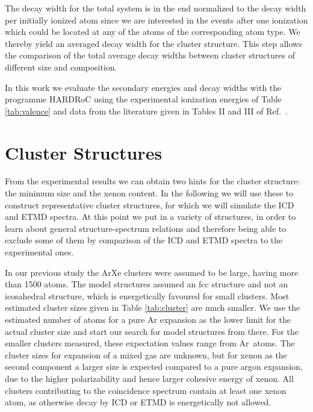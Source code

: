 \documentclass[journal=jpccck,manuscript=article]{achemso}
\begin{document}
The decay width for the total system is in the end normalized to the decay width
per initially ionized atom since we are interested in the events after one
ionization which could be located at any of the atoms of the corresponding atom
type. We thereby yield an averaged decay width for the cluster structure.
This step allows the comparison of the total average decay widths
between cluster structures of different size and composition.

In this work we evaluate the secondary energies and decay widths with
the programme HARDRoC\cite{HARDRoC,fasshauer2014} using the
experimental ionization energies of Table \ref{tab:valence}
and data from the literature given in Tables II and III of
Ref.\ .


\section{Cluster Structures}

From the experimental results we can obtain two hints for the cluster
structure: the minimum size and the xenon content. In the following we will 
use these to construct representative cluster structures, for which we will 
simulate the ICD and ETMD spectra. At this point we put in a variety of
structures, in order to learn about general structure-spectrum relations
and therefore being able to
exclude some of them by comparison of
the ICD and ETMD spectra to the experimental ones.

In our previous study\cite{Fasshauer13} the ArXe clusters were assumed
to be large, having more than 1500 atoms. The model structures assumed
an fcc structure and not an icosahedral structure, which is energetically
favoured for small clusters.
Most estimated cluster sizes given in Table \ref{tab:cluster} are much smaller.
We use the estimated number of atoms for a pure Ar expansion as the lower limit for the actual cluster size and start our search for model structures from there.
%
%
For the smaller clusters measured,
these expectation values range from \unit[3--21]{Ar atoms}. 
The cluster sizes for expansion of a mixed gas are unknown, but
for xenon as the second component a larger size is expected compared to a
pure argon expansion, due to the higher polarizability
and hence larger cohesive energy of xenon. All clusters
contributing to the coincidence spectrum
contain at least one xenon atom, as otherwise decay by ICD or ETMD is energetically not allowed.
\end{document}

